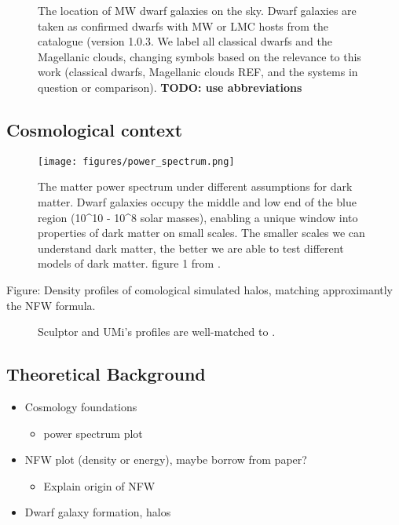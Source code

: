 \begin{figure}
\centering
{}
\caption[Dwarf galaxies sky position]{The location of MW dwarf galaxies
on the sky. Dwarf galaxies are taken as confirmed dwarfs with MW or LMC
hosts from the \citet{pace2024} catalogue (version 1.0.3. We label all
classical dwarfs and the Magellanic clouds, changing symbols based on
the relevance to this work (classical dwarfs, Magellanic clouds REF, and
the systems in question or comparison). \textbf{TODO: use
abbreviations}}
\end{figure}

\subsection{Cosmological context}\label{cosmological-context}

\begin{figure}
\centering
\texttt{[image: figures/power\_spectrum.png]}
\caption[Cosmological Power Spectrum]{The matter power spectrum under
different assumptions for dark matter. Dwarf galaxies occupy the middle
and low end of the blue region (10\^{}10 - 10\^{}8 solar masses),
enabling a unique window into properties of dark matter on small scales.
The smaller scales we can understand dark matter, the better we are able
to test different models of dark matter. figure 1 from
\citet{bechtol+2022}.}\label{fig:cosmological_power_spectrum}
\end{figure}

Figure: Density profiles of comological simulated halos, matching
approximantly the NFW formula.

\begin{figure}
\centering
{}
\caption[Idealized simulations match Scl and UMi]{Sculptor and UMi's
profiles are well-matched to \citet{PNM2008}.}\label{fig:toy_profiles}
\end{figure}

\subsection{Theoretical Background}\label{theoretical-background}

\begin{itemize}
\tightlist
\item
  Cosmology foundations

  \begin{itemize}
  \tightlist
  \item
    power spectrum plot
  \end{itemize}
\item
  NFW plot (density or energy), maybe borrow from paper?

  \begin{itemize}
  \tightlist
  \item
    Explain origin of NFW
  \end{itemize}
\item
  Dwarf galaxy formation, halos
\end{itemize}

